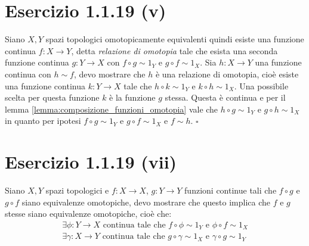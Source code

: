 \documentclass[10pt]{scrartcl}
\begin{document}
\section*{Esercizio 1.1.19 (v)}
Siano $ X, Y $ spazi topologici omotopicamente equivalenti quindi
esiste una funzione continua $ f \colon X \to Y $, detta
\emph{relazione di omotopia} tale che esista una seconda
funzione continua $ g \colon Y \to X $ con $ f \circ g \sim 1_Y $
e $ g \circ f \sim 1_X $. Sia $ h \colon X \to Y $ una funzione
continua con $ h \sim f $, devo mostrare che $ h $ è una
relazione di omotopia, cioè esiste una funzione continua
$ k \colon Y \to X $ tale che $ h \circ k \sim 1_Y $ e $ k \circ h \sim 1_X $.
Una possibile scelta per questa funzione $ k $ è la funzione
$ g $ stessa. Questa è continua e per il lemma \ref{lemma:composizione_funzioni_omotopia}
vale che $ h \circ g \sim 1_Y $ e $ g \circ h \sim 1_X $ in quanto per
ipotesi  $ f \circ g \sim 1_Y $ e $ g \circ f \sim 1_X $ e $ f \sim h $.
\hfill $ \square $

\section*{Esercizio 1.1.19 (vii)}
Siano $ X, Y $ spazi topologici e $ f \colon X \to X $,
$ g \colon Y \to Y $ funzioni continue tali che $ f \circ g $
e $ g \circ f $ siano equivalenze omotopiche, devo mostrare
che questo implica che $ f $ e $ g $ stesse siano
equivalenze omotopiche, cioè che:
\begin{gather*}
  \exists \phi \colon Y \to X \text{ continua tale che } f \circ \phi \sim 1_Y \text{ e } \phi \circ f \sim 1_X \\
  \exists \gamma \colon X \to Y \text{ continua tale che } g \circ \gamma \sim 1_X \text{ e } \gamma \circ g \sim 1_Y
\end{gather*}
\end{document}

